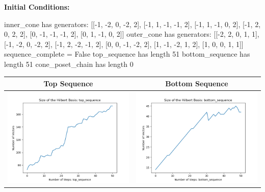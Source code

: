 \documentclass[10pt]{article}
\begin{document}
\textbf{Initial Conditions:}
\begin{SAGE}
inner_cone has generators: 
[[-1, -2, 0, -2, 2], [-1, 1, -1, -1, 2], [-1, 1, -1, 0, 2], [-1, 2, 0, 2, 2], [0, -1, -1, -1, 2], [0, 1, -1, 0, 2]]
outer_cone has generators: 
[[-2, 2, 0, 1, 1], [-1, -2, 0, -2, 2], [-1, 2, -2, -1, 2], [0, 0, -1, -2, 2], [1, -1, -2, 1, 2], [1, 0, 0, 1, 1]]
	sequence_complete = False
	top_sequence has length 51
	bottom_sequence has length 51
	cone_poset_chain has length 0

\end{SAGE}
\begin{tabular}{c|c}
\textbf{Top Sequence} & \textbf{Bottom Sequence} \\ \hline 
\begin{minipage}{.45\textwidth}
\includegraphics[width=\textwidth]{"DATA/5d/6 generators 2 bound E alternating/top_sequence SIZE"}
\end{minipage} &
\begin{minipage}{.45\textwidth}
\includegraphics[width=\textwidth]{"DATA/5d/6 generators 2 bound E alternating/bottom_sequence SIZE"}

\end{minipage}
\end{tabular}
\end{document}

